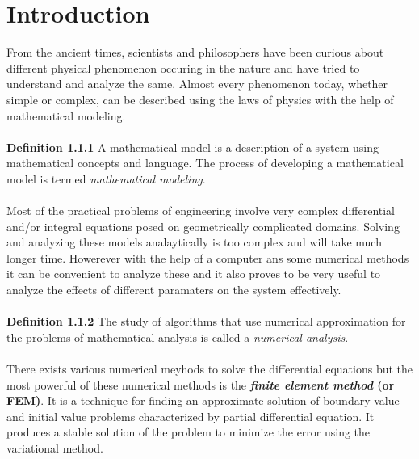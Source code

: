 \documentclass{report}
\numberwithin{equation}{chapter}
\begin{document}
\section{Introduction}
\begin{spacing}{1.5}
From the ancient times, scientists and philosophers have been curious about different physical phenomenon occuring in the nature and have tried to understand and analyze the same. Almost every phenomenon today, whether simple or complex, can be described using the laws of physics with the help of mathematical modeling.\\ \\
\textbf{Definition 1.1.1} A mathematical model is a description of a system using mathematical concepts and language. The process of developing a mathematical model is termed \textsl{mathematical modeling}.\\ \\
Most of the practical problems of engineering involve very complex differential and/or integral equations posed on geometrically complicated domains. Solving and analyzing these models analaytically is too complex and will take much longer time. Howerever with the help of a computer ans some numerical methods it can be convenient to analyze these and it also proves to be very useful to analyze the effects of different paramaters on the system effectively. \\ \\
\textbf{Definition 1.1.2}  The study of algorithms that use numerical approximation for the problems of mathematical analysis is called a \textsl{numerical analysis}.\\ \\ 
There exists various numerical meyhods to solve the differential equations but the most powerful of these numerical methods is the \textbf{\textsl{finite element method} (or FEM)}. It is a technique for finding an approximate solution of boundary value and initial value problems characterized by partial differential equation. It produces a stable solution of the problem to minimize the error using the variational method.
\end{spacing}
\end{document}
